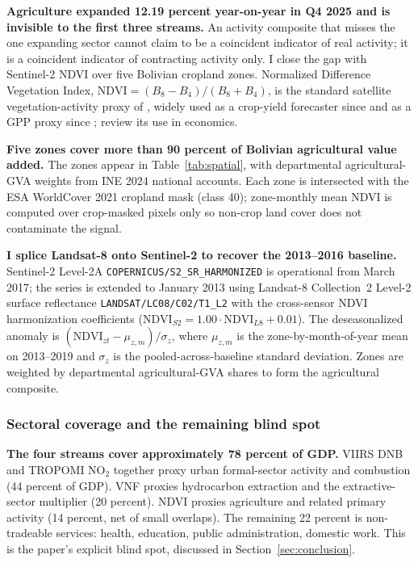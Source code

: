 \documentclass[11pt,letterpaper]{article}
\newcommand{\claim}[1]{\textbf{#1.}}
\begin{document}
\claim{Agriculture expanded \num{12.19} percent year-on-year in Q4 \num{2025} and is invisible to the first three streams} An activity composite that misses the one expanding sector cannot claim to be a coincident indicator of real activity; it is a coincident indicator of contracting activity only. I close the gap with Sentinel-2 NDVI over five Bolivian cropland zones. Normalized Difference Vegetation Index, $\mathrm{NDVI} = (B_8 - B_4) / (B_8 + B_4)$, is the standard satellite vegetation-activity proxy of \citet{gao1996}, widely used as a crop-yield forecaster since \citet{johnson_etal2014} and as a GPP proxy since \citet{donohue_etal2008}; \citet{donaldson_storeygard2016} review its use in economics.

\claim{Five zones cover more than \num{90} percent of Bolivian agricultural value added} The zones appear in Table~\ref{tab:spatial}, with departmental agricultural-GVA weights from INE \num{2024} national accounts. Each zone is intersected with the ESA WorldCover \num{2021} cropland mask (class \num{40}); zone-monthly mean NDVI is computed over crop-masked pixels only so non-crop land cover does not contaminate the signal.

\claim{I splice Landsat-8 onto Sentinel-2 to recover the \numrange{2013}{2016} baseline} Sentinel-2 Level-2A \texttt{COPERNICUS/S2\_SR\_HARMONIZED} is operational from March \num{2017}; the series is extended to January \num{2013} using Landsat-8 Collection~2 Level-2 surface reflectance \texttt{LANDSAT/LC08/C02/T1\_L2} with the \citet{roy_etal2016} cross-sensor NDVI harmonization coefficients ($\mathrm{NDVI}_{S2} = 1.00 \cdot \mathrm{NDVI}_{L8} + 0.01$). The deseasonalized anomaly is $(\mathrm{NDVI}_{zt} - \mu_{z,m}) / \sigma_z$, where $\mu_{z,m}$ is the zone-by-month-of-year mean on \numrange{2013}{2019} and $\sigma_z$ is the pooled-across-baseline standard deviation. Zones are weighted by departmental agricultural-GVA shares to form the agricultural composite.

\subsubsection{Sectoral coverage and the remaining blind spot}

\claim{The four streams cover approximately \num{78} percent of GDP} VIIRS DNB and TROPOMI NO$_2$ together proxy urban formal-sector activity and combustion (\num{44} percent of GDP). VNF proxies hydrocarbon extraction and the extractive-sector multiplier (\num{20} percent). NDVI proxies agriculture and related primary activity (\num{14} percent, net of small overlaps). The remaining \num{22} percent is non-tradeable services: health, education, public administration, domestic work. This is the paper's explicit blind spot, discussed in Section~\ref{sec:conclusion}.
\end{document}
